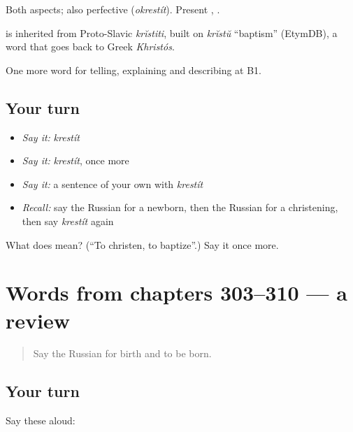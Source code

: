 Both aspects; also perfective \emph{} (\emph{okrestít}). Present \emph{}, \emph{}.

\begin{cousinweb}
\emph{} is inherited from Proto-Slavic \emph{krĭstiti}, built on \emph{krĭstŭ} \textquotedblleft{}baptism\textquotedblright{} (EtymDB), a word that goes back to Greek \emph{Khristós}.
\end{cousinweb}

\begin{grammarlens}[title={What you've built}]
One more word for telling, explaining and describing at B1.
\end{grammarlens}

\subsection*{Your turn}
\begin{itemize}
\raggedright
  \item \emph{Say it:} \emph{krestít}
  \item \emph{Say it:} \emph{krestít}, once more
  \item \emph{Say it:} a sentence of your own with \emph{krestít}
  \item \emph{Recall:} say the Russian for a newborn, then the Russian for a christening, then say \emph{krestít} again
\end{itemize}

\begin{tcolorbox}[breakable,colback=teal!4,colframe=teal!35!black,title={Before you move on}]
What does  mean? (\textquotedblleft{}To christen, to baptize\textquotedblright{}.) Say it once more.
\end{tcolorbox}
\section[(dialogue)]{Words from chapters 303–310 — a review}

\label{lesson:RU-R310-review-303-310}



\begin{quote}
Say the Russian for birth and to be born.
\end{quote}

\subsection*{Your turn}
Say these aloud:


